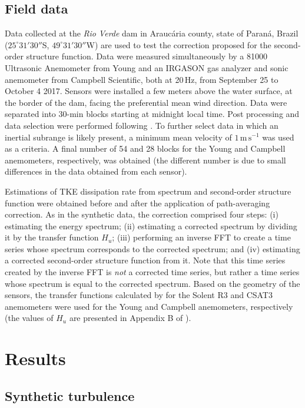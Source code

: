 \documentclass{svjour3}                     %
\begin{document}
\subsection{Field data \label{sec:fielddata}}

Data collected at the \textit{Rio Verde} dam in Arauc\'aria county,
state of Paran\'a, Brazil ($25^\circ31'30''$S, $49^\circ31'30''$W) are
used to test the correction proposed for the second-order structure
function. Data were measured simultaneously by a 81000 Ultrasonic
Anemometer from Young and an IRGASON gas analyzer and sonic anemometer
from Campbell Scientific, both at 20\,Hz, from September 25 to October
4 2017. Sensors were installed a few meters above the water surface,
at the border of the dam, facing the preferential mean wind
direction. Data were separated into 30-min blocks starting at midnight
local time. Post processing and data selection were performed
following \citet{ZahCho2016}. To further select data in which an
inertial subrange is likely present, a minimum mean velocity of
$1\,\mathrm{m\,s^{-1}}$ was used as a criteria. A final number of 54
and 28 blocks for the Young and Campbell anemometers, respectively,
was obtained (the different number is due to small differences in the
data obtained from each sensor).

Estimations of TKE dissipation rate from spectrum and second-order
structure function were obtained before and after the application of
path-averaging correction. As in the synthetic data, the correction
comprised four steps: (i) estimating the energy spectrum; (ii)
estimating a corrected spectrum by dividing it by the transfer
function $H_u$; (iii) performing an inverse FFT to create a time
series whose spectrum corresponds to the corrected spectrum; and (iv)
estimating a corrected second-order structure function from it. Note
that this time series created by the inverse FFT is \textit{not} a
corrected time series, but rather a time series whose spectrum is
equal to the corrected spectrum. Based on the geometry of the sensors,
the transfer functions calculated by \citet{HorOnc2006} for the Solent
R3 and CSAT3 anemometers were used for the Young and Campbell
anemometers, respectively (the values of $H_u$ are presented in
Appendix B of \citet{HorOnc2006}).


\section{Results \label{sec:res}}

\subsection{Synthetic turbulence}
\end{document}
